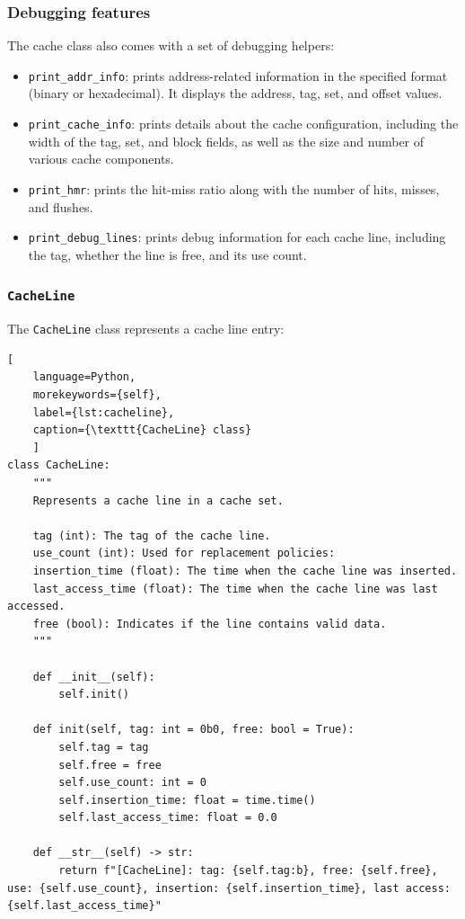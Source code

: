 \subsubsection*{Debugging features}
\noindent The cache class also comes with a set of debugging helpers:
\begin{itemize}
    \item \texttt{print\_addr\_info}: prints address-related information in the specified format (\mbox{binary} or \mbox{hexadecimal}). It displays the address, tag, set, and offset values.
    \item \texttt{print\_cache\_info}: prints details about the cache configuration, including the width of the tag, set, and block fields, as well as the size and number of various cache components.
    \item \texttt{print\_hmr}: prints the hit-miss ratio along with the number of hits, misses, and flushes.
    \item \texttt{print\_debug\_lines}: prints debug information for each cache line, including the tag, whether the line is free, and its use count.
\end{itemize}

\subsubsection{\texttt{CacheLine}}

The \texttt{CacheLine} class represents a cache line entry:

\begin{center}
\centering
\begin{minipage}{\linewidth}
\begin{lstlisting}[
    language=Python,
	morekeywords={self},
    label={lst:cacheline},
    caption={\texttt{CacheLine} class}
    ]
class CacheLine:
    """
    Represents a cache line in a cache set.

    tag (int): The tag of the cache line.
    use_count (int): Used for replacement policies:
    insertion_time (float): The time when the cache line was inserted.
    last_access_time (float): The time when the cache line was last accessed.
    free (bool): Indicates if the line contains valid data.
    """

    def __init__(self):
        self.init()

    def init(self, tag: int = 0b0, free: bool = True):
        self.tag = tag
        self.free = free
        self.use_count: int = 0
        self.insertion_time: float = time.time()
        self.last_access_time: float = 0.0

    def __str__(self) -> str:
        return f"[CacheLine]: tag: {self.tag:b}, free: {self.free}, use: {self.use_count}, insertion: {self.insertion_time}, last access: {self.last_access_time}"
\end{lstlisting}
\end{minipage}
\end{center}

